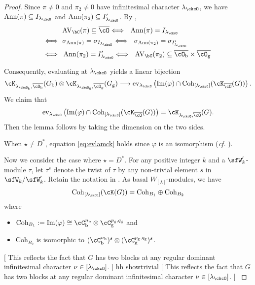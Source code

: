\documentclass[12pt,a4paper]{amsart}
\newcommand{\trivial}[2][]{\if\relax\detokenize{#1}\relax
  {%
      \color{orange} \vspace{0em} $[$  #2 $]$
      \color{black}
  }
  \else
\ifx#1h
\ifcsname showtrivial\endcsname
{%
    \color{orange} \vspace{0em}  $[$ #2 $]$
    \color{black}
}
\fi
\else {\red Wrong argument!} \fi
\fi
}
\newcommand{\AVC}{\mathrm{AV}_\bC}
\def\Im{\operatorname{Im}}
\DeclareMathOperator{\Ann}{Ann}
\numberwithin{equation}{section}
\theoremstyle{remark}
\def\cf{\emph{cf.} }
\def\lamck{\lambda_\ckcO}
\def\Lamck{[\lambda_\ckcO]}
\def\lamckb{\lambda_{\ckcO_{\mathrm b}}}
\def\lamckg{\lambda_{\ckcO_{\mathrm g}}}
\def\WLam{W_{\Lam}}
\def\nbb{n_{\mathrm b}}
\def\Im{\mathrm{Im}}
\def\Coh{\mathrm{Coh}}
\def\ev#1{{\mathrm{ev}_{#1}}}
\def\Gb{G_{\mathrm b}}
\def\Gg{G_{\mathrm g}}
\def\bcOb{\overline{\cO_{\mathrm b}}}
\def\bcOg{\overline{\cO_{\mathrm g}}}
\newcommand{\Lam}{{[\lambda]}}
\begin{document}
\begin{proof}
  Since $\pi \neq 0$ and $\pi_{2}\neq 0$ have infinitesimal character $\lamck$,  we have
  $\Ann(\pi)\subseteq I_{\lamck}$ and $\Ann(\pi_{2})\subseteq I'_{\lamck}$.
  By ,
  \[
\begin{split}
   & \AVC(\pi)  \subseteq \bcO %
  \IFF  \Ann(\pi)  = I_{\lamck} \\
  \IFF & \sigma_{\Ann(\pi)}  = \sigma_{I_{\lamck}} %
  \IFF  \sigma_{\Ann(\pi_{2})}  = \sigma_{I'_{\lamck}}\\
  \IFF & \Ann(\pi_{2})  = I'_{\lamck} %
   \IFF \AVC(\pi_{2})  \subseteq  \bcOb\times \bcOg
\end{split}
  \]


  Consequently, evaluating at $\lamck$ yields a linear bijection
  \[
    \cK_{\lamckb,\bcOb}(\Gb)\otimes \cK_{\lamckg,\bcOg}(\Gg) \longrightarrow \ev{\lamck}\left(\Im(\varphi)\cap \Coh_{\Lamck}(\cK_{\bcO}(G))\right).
  \]
  We claim that
  \begin{equation}\label{eq:evlamck}
    \ev{\lamck}\left(\Im(\varphi)\cap \Coh_{\Lamck}(\cK_{\bcO}(G))\right)  = \cK_{\lamck,\bcO}(G).
  \end{equation}
  Then the lemma follows by taking the dimension on the two sides.

  \smallskip

  When $\star \neq D^{*}$, equation  \eqref{eq:evlamck} holds since $\varphi$ is an isomorphism (\cf {}).

  Now we consider the case where $\star = D^{*}$.
  For any positive integer $k$ and a $\sfW'_{k}$-module
  $\tau$, let $\tau^{s}$ denote the twist of $\tau$ by any non-trivial element
  $s$ in $\sfW_{k}/\sfW'_{k}$.
  Retain the notation in .
  As basal $\WLam$-modules, we have
  \[
    \Coh_{\Lamck}(\cK(G))  =\Coh_{B_1} \oplus \Coh_{B_{2}}
  \]
  where
  \begin{itemize}
    \item $\Coh_{B_1} := \Im (\varphi) \cong
    \cC_{\mathrm b}^{\nbb}\otimes \cC_{\mathrm g}^{p_{\mathrm g},q_{\mathrm g}}$ and
    \item $\Coh_{B_2}$ is isomorphic to
    $(\cC_{\mathrm b}^{\nbb})^{s}\otimes (\cC_{\mathrm g}^{p_{\mathrm g},q_{\mathrm g}})^{s}$.
  \end{itemize}
  \trivial[h]{
  This reflects the fact that $G$ has two blocks at any regular dominant
  infinitesimal character $\nu\in \Lamck$.
  }


\end{proof}
\end{document}
